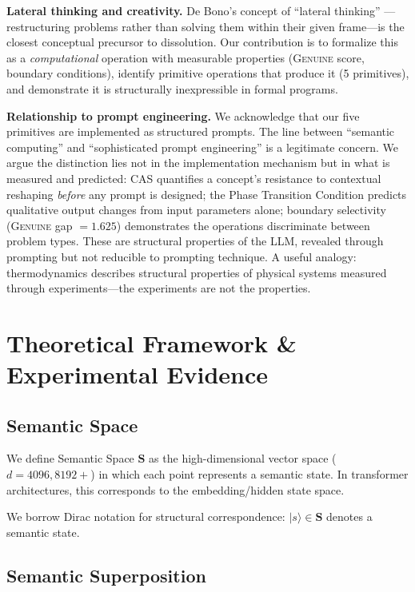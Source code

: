 \documentclass[11pt,a4paper]{article}
\newcommand{\ket}[1]{|#1\rangle}
\begin{document}
\textbf{Lateral thinking and creativity.} De Bono's concept of ``lateral thinking'' \citep{debono1967lateral}---restructuring problems rather than solving them within their given frame---is the closest conceptual precursor to dissolution. Our contribution is to formalize this as a \emph{computational} operation with measurable properties (\textsc{Genuine} score, boundary conditions), identify primitive operations that produce it (5 primitives), and demonstrate it is structurally inexpressible in formal programs.

\textbf{Relationship to prompt engineering.} We acknowledge that our five primitives are implemented as structured prompts. The line between ``semantic computing'' and ``sophisticated prompt engineering'' is a legitimate concern. We argue the distinction lies not in the implementation mechanism but in what is measured and predicted: CAS quantifies a concept's resistance to contextual reshaping \emph{before} any prompt is designed; the Phase Transition Condition predicts qualitative output changes from input parameters alone; boundary selectivity (\textsc{Genuine} gap $= 1.625$) demonstrates the operations discriminate between problem types. These are structural properties of the LLM, revealed through prompting but not reducible to prompting technique. A useful analogy: thermodynamics describes structural properties of physical systems measured through experiments---the experiments are not the properties.

\section{Theoretical Framework \& Experimental Evidence}

\subsection{Semantic Space}

We define Semantic Space $\mathbf{S}$ as the high-dimensional vector space ($d = 4096, 8192+$) in which each point represents a semantic state. In transformer architectures, this corresponds to the embedding/hidden state space.

We borrow Dirac notation for structural correspondence: $\ket{s} \in \mathbf{S}$ denotes a semantic state.

\subsection{Semantic Superposition}
\end{document}
